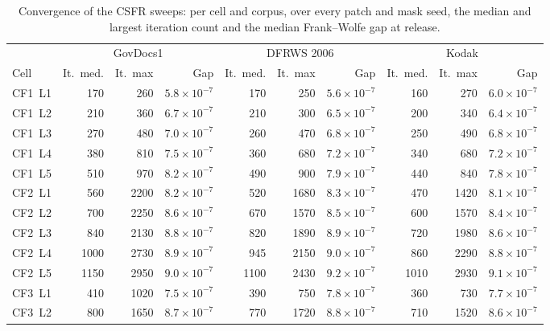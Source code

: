\documentclass[11pt]{article}
\begin{document}
\begin{table}[htbp]
\centering
\caption{Convergence of the CSFR sweeps: per cell and corpus, over every patch and mask seed, the median and largest iteration count and the median Frank--Wolfe gap at release.}
\label{tab:supp:convergence}
\footnotesize
\begin{tabular}{@{}l*{9}{r}@{}}
\toprule
 & \multicolumn{3}{c}{GovDocs1} & \multicolumn{3}{c}{DFRWS 2006} & \multicolumn{3}{c}{Kodak} \\
\cmidrule(lr){2-4}\cmidrule(lr){5-7}\cmidrule(lr){8-10}
Cell & It.\ med. & It.\ max & Gap & It.\ med. & It.\ max & Gap & It.\ med. & It.\ max & Gap \\
\midrule
CF1~L1 & 170 & 260 & $5.8 \times 10^{-7}$ & 170 & 250 & $5.6 \times 10^{-7}$ & 160 & 270 & $6.0 \times 10^{-7}$ \\
CF1~L2 & 210 & 360 & $6.7 \times 10^{-7}$ & 210 & 300 & $6.5 \times 10^{-7}$ & 200 & 340 & $6.4 \times 10^{-7}$ \\
CF1~L3 & 270 & 480 & $7.0 \times 10^{-7}$ & 260 & 470 & $6.8 \times 10^{-7}$ & 250 & 490 & $6.8 \times 10^{-7}$ \\
CF1~L4 & 380 & 810 & $7.5 \times 10^{-7}$ & 360 & 680 & $7.2 \times 10^{-7}$ & 340 & 680 & $7.2 \times 10^{-7}$ \\
CF1~L5 & 510 & 970 & $8.2 \times 10^{-7}$ & 490 & 900 & $7.9 \times 10^{-7}$ & 440 & 840 & $7.8 \times 10^{-7}$ \\
\midrule
CF2~L1 & 560 & 2200 & $8.2 \times 10^{-7}$ & 520 & 1680 & $8.3 \times 10^{-7}$ & 470 & 1420 & $8.1 \times 10^{-7}$ \\
CF2~L2 & 700 & 2250 & $8.6 \times 10^{-7}$ & 670 & 1570 & $8.5 \times 10^{-7}$ & 600 & 1570 & $8.4 \times 10^{-7}$ \\
CF2~L3 & 840 & 2130 & $8.8 \times 10^{-7}$ & 820 & 1890 & $8.9 \times 10^{-7}$ & 720 & 1980 & $8.6 \times 10^{-7}$ \\
CF2~L4 & 1000 & 2730 & $8.9 \times 10^{-7}$ & 945 & 2150 & $9.0 \times 10^{-7}$ & 860 & 2290 & $8.8 \times 10^{-7}$ \\
CF2~L5 & 1150 & 2950 & $9.0 \times 10^{-7}$ & 1100 & 2430 & $9.2 \times 10^{-7}$ & 1010 & 2930 & $9.1 \times 10^{-7}$ \\
\midrule
CF3~L1 & 410 & 1020 & $7.5 \times 10^{-7}$ & 390 & 750 & $7.8 \times 10^{-7}$ & 360 & 730 & $7.7 \times 10^{-7}$ \\
CF3~L2 & 800 & 1650 & $8.7 \times 10^{-7}$ & 770 & 1720 & $8.8 \times 10^{-7}$ & 710 & 1520 & $8.6 \times 10^{-7}$ \\

\end{tabular}
\end{table}
\end{document}
